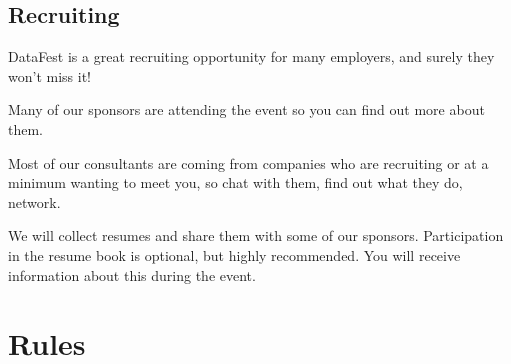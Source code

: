 \documentclass[]{article}
\begin{document}
\hypertarget{recruiting}{%
\subsection{Recruiting}\label{recruiting}}

DataFest is a great recruiting opportunity for many employers, and
surely they won't miss it!

Many of our sponsors are attending the event so you can find out more
about them.

Most of our consultants are coming from companies who are recruiting or
at a minimum wanting to meet you, so chat with them, find out what they
do, network.

We will collect resumes and share them with some of our sponsors.
Participation in the resume book is optional, but highly recommended.
You will receive information about this during the event.

\hypertarget{rules}{%
\section{Rules}\label{rules}}
\end{document}
